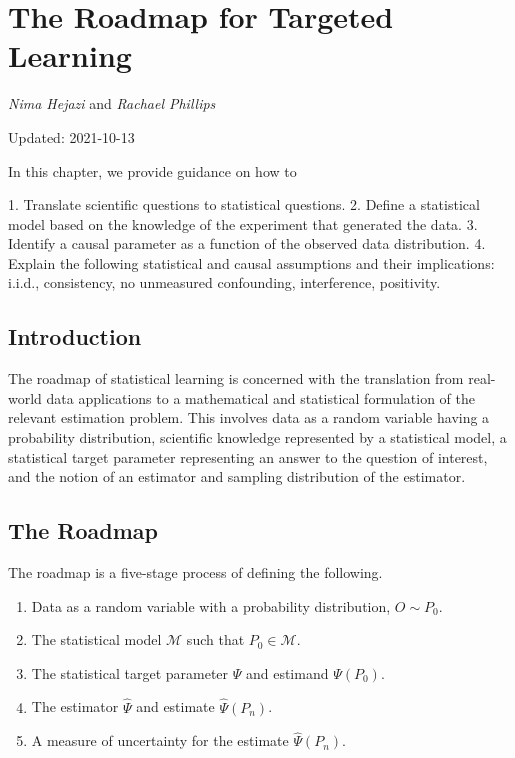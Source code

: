 \documentclass[
  12pt, krantz2,
]{krantz}
\providecommand{\tightlist}{%
  \setlength{\itemsep}{0pt}\setlength{\parskip}{0pt}}
\theoremstyle{definition}
\theoremstyle{definition}
\theoremstyle{definition}
\newcommand{\M}{\mathcal{M}}
\newcommand{\1}{\mathbbm{1}}
\begin{document}
\hypertarget{intro}{%
\chapter{The Roadmap for Targeted Learning}\label{intro}}

\emph{Nima Hejazi} and \emph{Rachael Phillips}

Updated: 2021-10-13

\begin{VT1}



In this chapter, we provide guidance on how to

1. Translate scientific questions to statistical questions.
2. Define a statistical model based on the knowledge of the experiment that
   generated the data.
3. Identify a causal parameter as a function of the observed data distribution.
4. Explain the following statistical and causal assumptions and their
   implications: i.i.d., consistency, no unmeasured confounding, interference,
   positivity.

\end{VT1}

\hypertarget{introduction}{%
\section*{Introduction}\label{introduction}}


The roadmap of statistical learning is concerned with the translation from
real-world data applications to a mathematical and statistical formulation of
the relevant estimation problem. This involves data as a random variable having
a probability distribution, scientific knowledge represented by a statistical
model, a statistical target parameter representing an answer to the question of
interest, and the notion of an estimator and sampling distribution of the
estimator.

\hypertarget{roadmap}{%
\section{The Roadmap}\label{roadmap}}

The roadmap is a five-stage process of defining the following.

\begin{enumerate}
\def\labelenumi{\arabic{enumi}.}
\tightlist
\item
  Data as a random variable with a probability distribution, \(O \sim P_0\).
\item
  The statistical model \(\M\) such that \(P_0 \in \M\).
\item
  The statistical target parameter \(\Psi\) and estimand \(\Psi(P_0)\).
\item
  The estimator \(\hat{\Psi}\) and estimate \(\hat{\Psi}(P_n)\).
\item
  A measure of uncertainty for the estimate \(\hat{\Psi}(P_n)\).
\end{enumerate}
\end{document}
